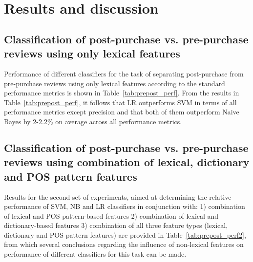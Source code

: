 \documentclass[runningheads,a4paper]{llncs}
\begin{document}
\section{Results and discussion}
\subsection{Classification of post-purchase vs. pre-purchase reviews using only lexical features}

Performance of different classifiers for the task of separating post-purchase from pre-purchase reviews using only lexical features according to the standard performance metrics is
shown in Table~\ref{tab:prepost_perf}. From the results in Table~\ref{tab:prepost_perf}, it follows that LR outperforms SVM in terms of all performance metrics except precision and
that both of them outperform Naive Bayes by 2-2.2\% on average across all performance metrics.

\subsection{Classification of post-purchase vs. pre-purchase reviews using combination of lexical, dictionary and POS pattern features}

Results for the second set of experiments, aimed at determining the relative performance of SVM, NB and LR classifiers in conjunction with: 1) combination of lexical and POS
pattern-based features 2) combination of lexical and dictionary-based features 3) combination of all three feature types (lexical, dictionary and POS pattern features) are provided
in Table~\ref{tab:prepost_perf2}, from which several conclusions regarding the influence of non-lexical features on performance of different classifiers for this task can be made.
\end{document}
